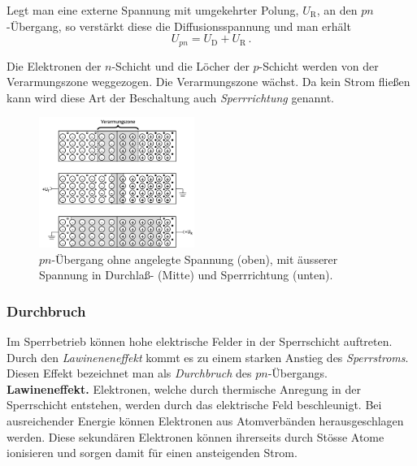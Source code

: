 Legt man eine externe Spannung mit umgekehrter Polung,
$U_{\mathrm{R}}$, an den $pn$-\"Ubergang, so verst\"arkt diese die
Diffusionsspannung und man erh\"alt
%
\begin{equation}
U_{pn} = U_{\mathrm{D}} + U_{\mathrm{R}} \, .
\end{equation}

Die Elektronen der $n$-Schicht und die L\"ocher der $p$-Schicht werden
von der Verarmungszone weggezogen. Die Verarmungszone w\"achst. Da
kein Strom fließen kann wird diese Art der Beschaltung auch {\it
Sperrrichtung} genannt.

\begin{figure}[ht!]
\begin{center}
\includegraphics[width=0.45\textwidth]{Versuch_17-18/Abbildungen/pn_Uebergang.jpg}
\end{center}
\caption{$pn$-\"Ubergang ohne angelegte Spannung (oben), mit \"ausserer Spannung in Durchlaß- (Mitte) und Sperrrichtung (unten).}
\label{fig:Verarmung}
\end{figure}

\subsubsection{Durchbruch}

Im Sperrbetrieb k\"onnen hohe elektrische Felder in der Sperrschicht
auftreten. Durch den {\it Lawineneneffekt} kommt
es zu einem starken Anstieg des {\it Sperrstroms}. Diesen Effekt bezeichnet 
man als {\it Durchbruch} des $pn$-\"Ubergangs.\\

\noindent
\textbf{Lawineneffekt.} 
%
Elektronen, welche durch thermische Anregung in der Sperrschicht entstehen,
werden durch das elektrische Feld beschleunigt. Bei ausreichender
Energie k\"onnen Elektronen aus Atomverb\"anden herausgeschlagen
werden. Diese sekund\"aren Elektronen k\"onnen ihrerseits durch
St\"osse Atome ionisieren und sorgen damit f\"ur einen ansteigenden
Strom.

